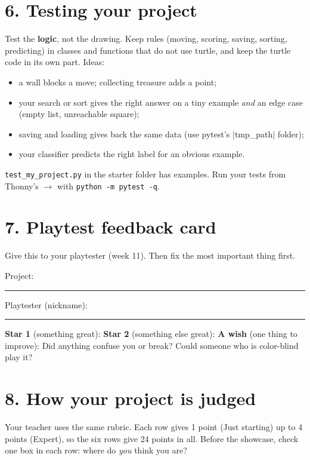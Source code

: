 \documentclass[level=3]{kidscode}
\begin{document}
\section{6. Testing your project}
Test the \textbf{logic}, not the drawing. Keep rules (moving, scoring, saving, sorting, predicting)
in classes and functions that do not use turtle, and keep the turtle code in its own part. Ideas:
\begin{itemize}[itemsep=1pt]
  \item a wall blocks a move; collecting treasure adds a point;
  \item your search or sort gives the right answer on a tiny example \emph{and} an edge case
        (empty list, unreachable square);
  \item saving and loading gives back the same data (use pytest's \py|tmp_path| folder);
  \item your classifier predicts the right label for an obvious example.
\end{itemize}
\texttt{test\_my\_project.py} in the starter folder has examples. Run your tests from Thonny's
 $\rightarrow$  with \texttt{python -m pytest -q}.

\section{7. Playtest feedback card}
Give this to your playtester (week 11). Then fix the most important thing first.

\begin{reflection}
Project: \rule{5cm}{0.4pt} \quad Playtester (nickname): \rule{4cm}{0.4pt}\par
\textbf{Star 1} (something great): 
\textbf{Star 2} (something else great): 
\textbf{A wish} (one thing to improve): 
Did anything confuse you or break? Could someone who is color-blind play it? 
\end{reflection}

\section{8. How your project is judged}
Your teacher uses the same rubric. Each row gives 1 point (Just starting) up to 4 points
(Expert), so the six rows give 24 points in all. Before the showcase, check one box in each row:
where do \emph{you} think you are?
\end{document}
